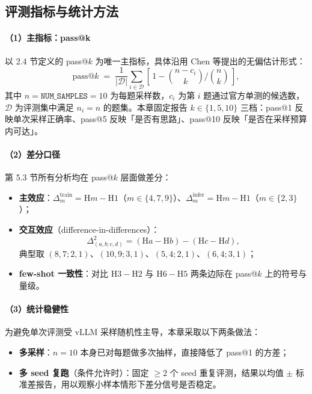 \subsection{评测指标与统计方法}

\paragraph{（1）主指标：pass@k}
以 2.4 节定义的 pass@$k$ 为唯一主指标，具体沿用 Chen 等提出的无偏估计形式：
\[
\mathrm{pass@}k \;=\; \frac{1}{|\mathcal{D}|}\sum_{i \in \mathcal{D}}\!\left[\,1 - \binom{n-c_i}{k}\Big/\binom{n}{k}\,\right],
\]
其中 $n{=}\texttt{NUM\_SAMPLES}{=}10$ 为每题采样数，$c_i$ 为第 $i$ 题通过官方单测的候选数，$\mathcal{D}$ 为评测集中满足 $n_i{=}n$ 的题集。本章固定报告 $k \in \{1, 5, 10\}$ 三档：pass@1 反映单次采样正确率、pass@5 反映「是否有思路」、pass@10 反映「是否在采样预算内可达」。

\paragraph{（2）差分口径}
第 5.3 节所有分析均在 pass@$k$ 层面做差分：
\begin{itemize}
    \item \textbf{主效应}：$\Delta^{\text{train}}_{m} = \mathrm{H}m - \mathrm{H1}$（$m \in \{4,7,9\}$）、$\Delta^{\text{infer}}_{m} = \mathrm{H}m - \mathrm{H1}$（$m \in \{2,3\}$）；
    \item \textbf{交互效应}（difference-in-differences）：
    \[
    \Delta^{2}_{(a,b;c,d)} = (\mathrm{H}a - \mathrm{H}b) - (\mathrm{H}c - \mathrm{H}d),
    \]
    典型取 $(8,7;2,1)$、$(10,9;3,1)$、$(5,4;2,1)$、$(6,4;3,1)$；
    \item \textbf{few-shot 一致性}：对比 $\mathrm{H3}-\mathrm{H2}$ 与 $\mathrm{H6}-\mathrm{H5}$ 两条边际在 pass@$k$ 上的符号与量级。
\end{itemize}

\paragraph{（3）统计稳健性}
为避免单次评测受 vLLM 采样随机性主导，本章采取以下两条做法：
\begin{itemize}
    \item \textbf{多采样}：$n{=}10$ 本身已对每题做多次抽样，直接降低了 pass@1 的方差；
    \item \textbf{多 seed 复跑}（条件允许时）：固定 $\ge 2$ 个 seed 重复评测，结果以均值 $\pm$ 标准差报告，用以观察小样本情形下差分信号是否稳定。
\end{itemize}

